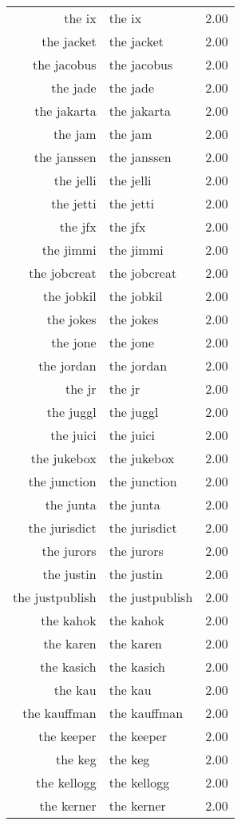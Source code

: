 \begin{table}[ht]
\begin{tabular}{rlr}
  the ix & the ix & 2.00 \\ 
  the jacket & the jacket & 2.00 \\ 
  the jacobus & the jacobus & 2.00 \\ 
  the jade & the jade & 2.00 \\ 
  the jakarta & the jakarta & 2.00 \\ 
  the jam & the jam & 2.00 \\ 
  the janssen & the janssen & 2.00 \\ 
  the jelli & the jelli & 2.00 \\ 
  the jetti & the jetti & 2.00 \\ 
  the jfx & the jfx & 2.00 \\ 
  the jimmi & the jimmi & 2.00 \\ 
  the jobcreat & the jobcreat & 2.00 \\ 
  the jobkil & the jobkil & 2.00 \\ 
  the jokes & the jokes & 2.00 \\ 
  the jone & the jone & 2.00 \\ 
  the jordan & the jordan & 2.00 \\ 
  the jr & the jr & 2.00 \\ 
  the juggl & the juggl & 2.00 \\ 
  the juici & the juici & 2.00 \\ 
  the jukebox & the jukebox & 2.00 \\ 
  the junction & the junction & 2.00 \\ 
  the junta & the junta & 2.00 \\ 
  the jurisdict & the jurisdict & 2.00 \\ 
  the jurors & the jurors & 2.00 \\ 
  the justin & the justin & 2.00 \\ 
  the justpublish & the justpublish & 2.00 \\ 
  the kahok & the kahok & 2.00 \\ 
  the karen & the karen & 2.00 \\ 
  the kasich & the kasich & 2.00 \\ 
  the kau & the kau & 2.00 \\ 
  the kauffman & the kauffman & 2.00 \\ 
  the keeper & the keeper & 2.00 \\ 
  the keg & the keg & 2.00 \\ 
  the kellogg & the kellogg & 2.00 \\ 
  the kerner & the kerner & 2.00 \\ 

\end{tabular}
\end{table}
